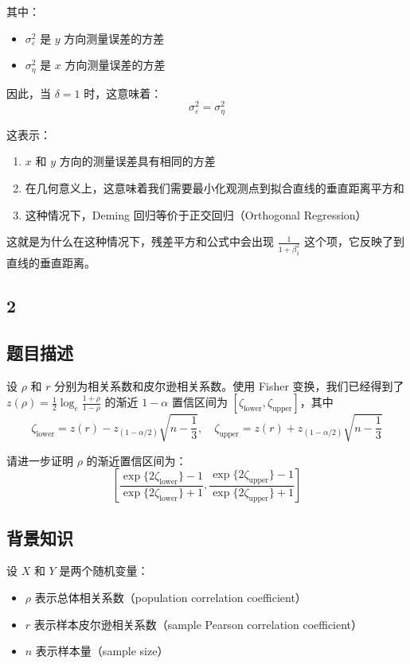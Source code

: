 \documentclass[UTF8]{report}
\theoremstyle{MyLineTheoremStyle} %
\theoremstyle{MyBlockTheoremStyle} %
\theoremstyle{MySubsubsectionStyle} %
\begin{document}
其中：
\begin{itemize}
\item $\sigma^2_\varepsilon$ 是 $y$ 方向测量误差的方差
\item $\sigma^2_\eta$ 是 $x$ 方向测量误差的方差
\end{itemize}

因此，当 $\delta = 1$ 时，这意味着：
$$
\sigma^2_\varepsilon = \sigma^2_\eta
$$

这表示：
\begin{enumerate}
\item $x$ 和 $y$ 方向的测量误差具有相同的方差
\item 在几何意义上，这意味着我们需要最小化观测点到拟合直线的垂直距离平方和
\item 这种情况下，Deming 回归等价于正交回归（Orthogonal Regression）
\end{enumerate}

这就是为什么在这种情况下，残差平方和公式中会出现 $\frac{1}{1 + \beta_1^2}$ 这个项，它反映了到直线的垂直距离。

\subsection{2}
\subsection*{题目描述}
设 $\rho$ 和 $r$ 分别为相关系数和皮尔逊相关系数。使用 Fisher 变换，我们已经得到了 $z(\rho) = \frac{1}{2} \log_e \frac{1+\rho}{1-\rho}$ 的渐近 $1 - \alpha$ 置信区间为 $[\zeta_{\text{lower}}, \zeta_{\text{upper}}]$，其中
\[
\zeta_{\text{lower}} = z(r) - z_{(1-\alpha/2)}\sqrt{n - \frac{1}{3}}, \quad \zeta_{\text{upper}} = z(r) + z_{(1-\alpha/2)}\sqrt{n - \frac{1}{3}}
\]

请进一步证明 $\rho$ 的渐近置信区间为：
\[
\left[ \frac{\exp\{2 \zeta_{\text{lower}}\} - 1}{\exp\{2 \zeta_{\text{lower}}\} + 1}, \frac{\exp\{2 \zeta_{\text{upper}}\} - 1}{\exp\{2 \zeta_{\text{upper}}\} + 1} \right]
\]


\subsection*{背景知识}

设 $X$ 和 $Y$ 是两个随机变量：

\begin{itemize}
    \item $\rho$ 表示总体相关系数（population correlation coefficient）
    \item $r$ 表示样本皮尔逊相关系数（sample Pearson correlation coefficient）
    \item $n$ 表示样本量（sample size）
\end{itemize}
\end{document}
